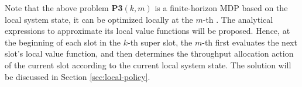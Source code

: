 Note that the above problem \textbf{P3$(k,m)$} is a finite-horizon MDP based on the local system state, it can be optimized locally at the $m$-th {\IAV}. The analytical expressions to approximate its local value functions will be proposed. Hence, at the beginning of each slot in the $k$-th super slot, the $m$-th {\IAV} first evaluates the next slot's local value function, and then determines the throughput allocation action of the current slot  according to the current local system state. The solution will be discussed in Section \ref{sec:local-policy}.
